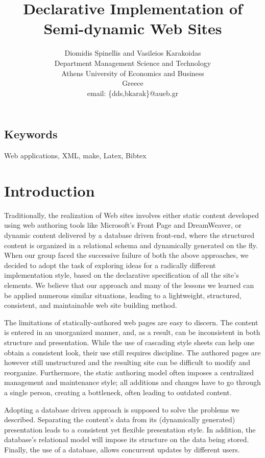 \documentclass[10pt]{article}
\title{Declarative Implementation of Semi-dynamic Web Sites}
\author{Diomidis Spinellis and Vasileios Karakoidas\\
Department Management Science and Technology \\
Athens University of Economics and Business \\
Greece\\
email: \{dds,bkarak\}@aueb.gr}
\date{}
\begin{document}
\maketitle

\begin{abstract}
\end{abstract}

\subsection*{Keywords}
Web applications, XML, make, Latex, Bibtex

\section{Introduction}
\label{sec:intro}
Traditionally, the realization of Web sites involves either
static content developed using web authoring tools like
Microsoft's Front Page and DreamWeaver, or dynamic
content delivered by a database driven front-end,
where the structured content is organized
in a relational schema and dynamically generated on the fly.
When our group faced the successive failure of both the above approaches,
we decided to adopt the task of exploring ideas for a radically different
implementation style, based on the declarative specification
of all the site's elements.
We believe that our approach and many of the lessons we learned
can be applied numerous similar situations,
leading to a lightweight, structured, consistent, and maintainable
web site building method.

The limitations of statically-authored web pages are easy to discern.
The content is entered in an unorganized manner, and, as a result,
can be inconsistent in both structure and presentation.
While the use of cascading style sheets can help one obtain a
consistent look, their use still requires discipline.
The authored pages are however still unstructured and the resulting
site can be difficult to modify and reorganize.
Furthermore, the static authoring model often imposes a centralized
management and maintenance style;
all additions and changes have to go through a single person,
creating a bottleneck, often leading to outdated content.

Adopting a database driven approach is supposed to
solve the problems we described.
Separating the content's data from its (dynamically generated)
presentation leads to a consistent
yet flexible presentation style.
In addition, the database's relational model will impose
its structure on the data being stored.
Finally, the use of a database, allows concurrent updates by
different users.
\end{document}
